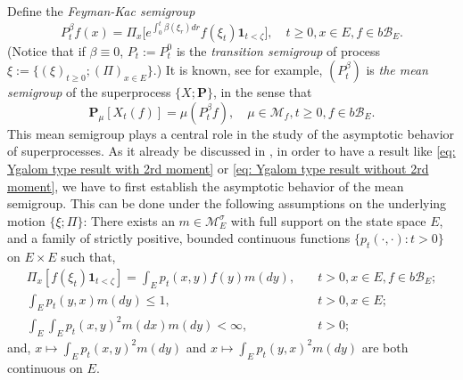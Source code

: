\documentclass[12pt, a4paper]{amsart}
\theoremstyle{definition}
\newenvironment{asp}[1]{\renewcommand\theinnerasp{#1}\innerasp}{\endinnerasp}
\numberwithin{equation}{section}
\begin{document}
	Define the \emph{Feyman-Kac semigroup}
\[
	P^\beta_tf(x)
	= \Pi_x \big[e^{\int_0^{t} \beta(\xi_r)dr} f(\xi_t)\mathbf 1_{t<\zeta}\big],
	\quad t\geq 0, x\in E, f\in b\mathscr B_E.
\]
	(Notice that if $\beta \equiv 0$,
	 $P_t:= P^0_t$ is the \emph{transition semigroup} of process $\xi:=\{(\xi)_{t\ge 0}; (\Pi)_{x\in E}\}$.)
	It is known, see \cite[Proposition 2.27]{Li2011Measure-valued} for example, $(P^\beta_t)$ is \emph{the mean semigroup} of the superprocess $\{X; \mathbf P\}$, in the sense that
	\[ \label{eq: Ygalom type result without 2rd moment}
	\mathbf P_\mu [X_t(f)]
	= \mu(P^\beta_t f),
	\quad \mu \in \mathcal M_f, t \geq 0,f \in b\mathscr B_E.
	\]
	This mean semigroup plays a central role in the study of the asymptotic behavior of superprocesses.
	As it already be discussed in \cite{EvansPerkins1990Measure-valued}, in order to have a result like \eqref{eq: Ygalom type result with 2rd moment} or \eqref{eq: Ygalom type result without 2rd moment}, we have to first establish the asymptotic behavior of the mean semigroup.
	This can be done under the following assumptions on the underlying motion $\{\xi; \Pi\}$:
\begin{asp}{1}
\label{asp: 1}
	There exists an $m \in \mathcal M_E^\sigma$ with full support on the state space $E$, and a family of strictly positive, bounded continuous functions $\{ p_t(\cdot,\cdot): t > 0 \}$ on $E \times E$ such that,
\[\begin{split}
	\Pi_x[ f(\xi_t)\mathbf 1_{t < \zeta} ]
	= \int_E p_t(x,y) f(y) m(dy),
	&\quad t>0, x \in E,f \in b\mathscr B_E;
	\\\int_E p_t(y,x)m(dy)
	\leq 1,	
	&\quad t>0,x\in E;
	\\\int_E \int_E p_t(x,y)^2 m(dx) m(dy)
	<\infty,
	&\quad t> 0;
\end{split}\]
	and, $x \mapsto \int_E p_t(x,y)^2 m(dy)$
and 
	$x \mapsto \int_E p_t(y,x)^2 m(dy)$ are both continuous on $E$.
\end{asp}
\end{document}
